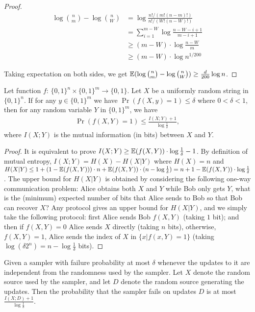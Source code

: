 \begin{proof}
  \begin{align}
  \log {n \choose m}-\log {n \choose W}
  &= \log \frac{n!/(m!(n-m)!)}{n!/(W!(n-W)!)} \\
  &= \sum_{i=1}^{m-W}\log \frac{n-W-i+1}{m-i+1} \\
  &\ge (m-W)\cdot \log \frac{n-W}{m} \\
  &\ge (m-W)\cdot \log n^{1/200}
  \end{align}
  
  Taking expectation on both sides, we get $\operatorname*{\mathbb{E}}(\log {n \choose m}-\log {n \choose W})\ge \frac{d}{200} \log n$. 
\end{proof}

\begin{lemma}\label{lemma:mutual-entropy-vs-fail-prob}
  Let function $f$: $\{0,1\}^n\times \{0,1\}^m\rightarrow \{0,1\}$. Let $X$ be a uniformly random string in $\{0,1\}^n$. If for any $y\in \{0,1\}^m$ we have $\Pr(f(X,y)=1)\le \delta$ where $0<\delta<1$, then for any random variable $Y$ in $\{0,1\}^m$, we have 
  \begin{align}
    \Pr(f(X,Y)=1)\le \frac{I(X;Y)+1}{\log \frac{1}{\delta}},
  \end{align}
  where $I(X;Y)$ is the mutual information (in bits) between $X$ and $Y$.
\end{lemma}

\begin{proof}
  It is equivalent to prove $I(X;Y)\ge \operatorname*{\mathbb{E}}(f(X,Y))\cdot \log\frac{1}{\delta}-1$. By definition of mutual entropy, $I(X;Y)=H(X)-H(X|Y)$ where $H(X)=n$ and $H(X|Y)\le 1+(1-\operatorname*{\mathbb{E}}(f(X,Y)))\cdot n+\operatorname*{\mathbb{E}}(f(X,Y))\cdot (n-\log\frac{1}{\delta})=n+1-\operatorname*{\mathbb{E}}(f(X,Y))\cdot \log\frac{1}{\delta}$.
  The upper bound for $H(X|Y)$ is obtained by considering the following one-way communication problem: Alice obtains both $X$ and $Y$ while Bob only gets $Y$, what is the (minimum) expected number of bits that Alice sends to Bob so that Bob can recover $X$? 
  Any protocol gives an upper bound for $H(X|Y)$, and we simply take the following protocol: first Alice sends Bob $f(X,Y)$ (taking $1$ bit); and then if $f(X,Y)=0$ Alice sends $X$ directly (taking $n$ bits), otherwise, $f(X,Y)=1$, Alice sends the index of $X$ in $\{x|f(x,Y)=1\}$ (taking $\log (\delta 2^n)=n-\log\frac{1}{\delta}$ bits).  
\end{proof}

\begin{corollary}\label{corollary:sampler-failure}
  Given a sampler with failure probability at most $\delta$ whenever the updates to it are independent from the randomness used by the sampler. Let $X$ denote the random source used by the sampler, and let $D$ denote the random source generating the updates. Then the probability that the sampler fails on updates $D$ is at most $\frac{I(X;D)+1}{\log\frac{1}{\delta}}$.
\end{corollary}

